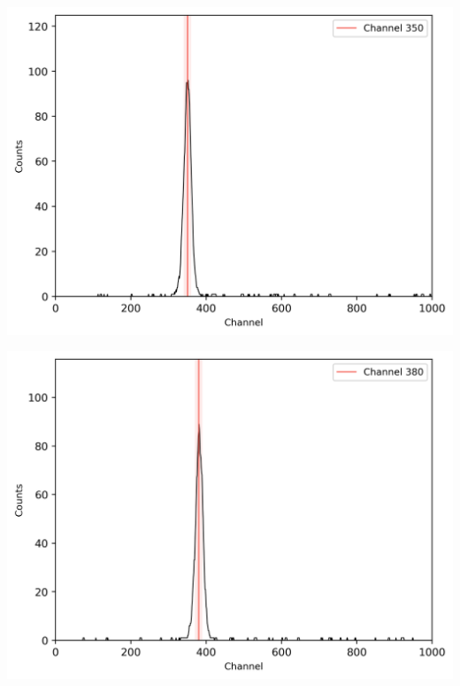 \begin{center}
    \begin{adjustbox}{max width=\linewidth, keepaspectratio}
        \includegraphics[]{png/60CoZeitspektrum20ns}
    \end{adjustbox}
    \label{fig:}
\end{center}
%
\begin{center}
    \begin{adjustbox}{max width=\linewidth, keepaspectratio}
        \includegraphics[]{png/60CoZeitspektrum40ns}
    \end{adjustbox}
    \label{fig:}
\end{center}
%
